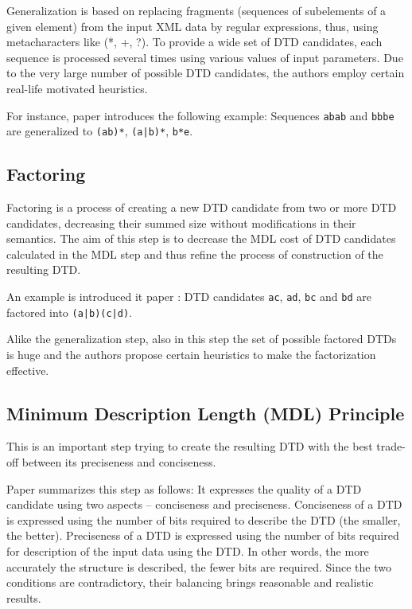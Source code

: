 Generalization is based on replacing fragments (sequences of subelements of a given element) from the input XML data by regular expressions, thus, using metacharacters like (*, +, ?). To provide a wide set of DTD candidates, each sequence is processed several times using various values of input parameters. Due to the very large number of possible DTD candidates, the authors employ certain real-life motivated heuristics.

For instance, paper \cite{Garofalakis:2000:XSE:342009.335409} introduces the following example: Sequences \texttt{abab} and \texttt{bbbe} are generalized to \texttt{(ab)*}, \texttt{(a|b)*}, \texttt{b*e}.

\subsection{Factoring}
Factoring is a process of creating a new DTD candidate from two or more DTD candidates, decreasing their summed size without modifications in their semantics. The aim of this step is to decrease the MDL cost of DTD candidates calculated in the MDL step and thus refine the process of construction of the resulting DTD.

An example is introduced it paper \cite{Garofalakis:2000:XSE:342009.335409}: DTD candidates \texttt{ac}, \texttt{ad}, \texttt{bc} and \texttt{bd} are factored into \texttt{(a|b)(c|d)}.

Alike the generalization step, also in this step the set of possible factored DTDs is huge and the authors propose certain heuristics to make the factorization effective.

\subsection{Minimum Description Length (MDL) Principle}
This is an important step trying to create the resulting DTD with the best trade-off between its preciseness and conciseness.  

Paper \cite{Mlynkova:2008:AAX:1494650.1495496} summarizes this step as follows: It expresses the quality of a DTD candidate using two aspects – conciseness and preciseness. Conciseness of a DTD is expressed using the number of bits required to describe the DTD (the smaller, the better). Preciseness of a DTD is expressed using the number of bits required for description of the input data using the DTD. In other words, the more accurately the structure is described, the fewer bits are required. Since the two conditions are contradictory, their balancing brings reasonable and realistic results.

